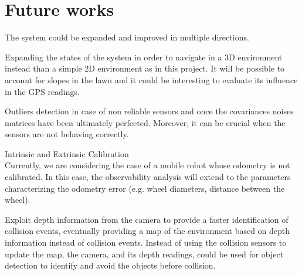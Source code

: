 \section{Future works}
\label{sec:futureWork}


\noindent The system could be expanded and improved in multiple directions. 


Expanding the states of the system in order to navigate in a 3D environment instead than a simple 2D environment as in this project.
It will be possible to account for slopes in the lawn and it could be interesting to evaluate its influence in the GPS readings.

Outliers detection in case of non reliable sensors and once the covariances noises matrices have been ultimately perfected. Moreover, it can be crucial when the sensors are not behaving correctly.


Intrinsic and Extrinsic Calibration\\
Currently, we are considering the case of a mobile
robot whose odometry is not calibrated. In this case,
the observability analysis will extend to the parameters
characterizing the odometry error (e.g. wheel diameters,
distance between the wheel).



Exploit depth information from the camera to provide a faster identification of collision events, eventually providing a map of the environment based on depth information instead of collision events.
Instead of using the collision sensors to update the map, the camera, and its depth readings,  could be used for object detection to identify and avoid the objects before collision.


